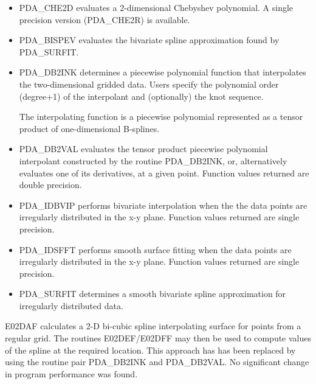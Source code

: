 \begin{itemize}

\item {}
   PDA\_CHE2D evaluates a 2-dimensional Chebyshev polynomial. A single
   precision version (PDA\_CHE2R) is available.

\item {}
   PDA\_BISPEV evaluates the bivariate spline approximation found by 
   PDA\_SURFIT.
 
\item {}
   PDA\_DB2INK determines a piecewise polynomial function that
   interpolates the two-dimensional gridded data. Users specify
   the polynomial order (degree+1) of the interpolant and
   (optionally) the knot sequence.

   The interpolating  function  is  a  piecewise  polynomial
   represented as a tensor product of one-dimensional  B-splines. 

\item {}   
    PDA\_DB2VAL evaluates  the  tensor product piecewise  polynomial
    interpolant constructed by the routine PDA\_DB2INK, or, 
    alternatively evaluates one of its derivatives, at a given point. 
    Function values returned are double precision.

\item {}
     PDA\_IDBVIP performs bivariate interpolation when the 
     the data points are irregularly distributed in the x-y plane.
     Function values returned are single precision.

\item {}
     PDA\_IDSFFT performs smooth surface fitting when the data points 
     are irregularly distributed in the x-y plane. 
     Function values returned are single precision.

\item {}
     PDA\_SURFIT determines a smooth bivariate spline approximation for
     irregularly distributed data.

\end{itemize}


E02DAF calculates a 2-D bi-cubic spline interpolating surface 
for points from a regular grid. The routines E02DEF/E02DFF may then
be used to compute values of the spline at the required location.
This approach has has been replaced by using the routine pair PDA\_DB2INK 
and PDA\_DB2VAL. No significant change in program performance
was found. 

